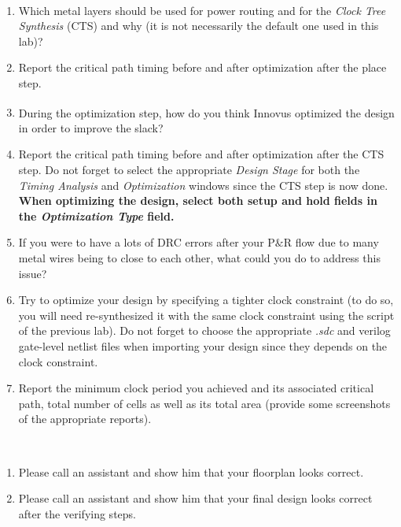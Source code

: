 \begin{exercisesum}\	
	\vspace{-2mm}
	\begin{enumerate}
		\item Which metal layers should be used for power routing and for the \textit{Clock Tree Synthesis} (CTS) and why (it is not necessarily the default one used in this lab)?
		\item Report the critical path timing before and after optimization after the place step.
		\item During the optimization step, how do you think Innovus\textsuperscript{\tiny\textregistered} optimized the design in order to improve the slack?
		\item Report the critical path timing before and after optimization after the CTS step. Do not forget to select the appropriate \textit{Design Stage} for both the \textit{Timing Analysis} and \textit{Optimization} windows since the CTS step is now done. \textbf{When optimizing the design, select both setup and hold fields in the \textit{Optimization Type} field.}
		\item If you were to have a lots of DRC errors after your P$\&$R flow due to many metal wires being to close to each other, what could you do to address this issue?
		\item Try to optimize your design by specifying a tighter clock constraint (to do so, you will need re-synthesized it with the same clock constraint using the script of the previous lab). Do not forget to choose the appropriate \textit{.sdc} and verilog gate-level netlist files when importing your design since they depends on the clock constraint.
		\item Report the minimum clock period you achieved and its associated critical path, total number of cells as well as its total area (provide some screenshots of the appropriate reports). 
	\end{enumerate}
	\vspace{-5mm}
\end{exercisesum}	


\begin{checkpointsum}\
	\vspace{-2mm}
	\begin{enumerate}
		\item Please call an assistant and show him that your floorplan looks correct.
		\item Please call an assistant and show him that your final design looks correct after the verifying steps.
	\end{enumerate}
	\vspace{-5mm}
\end{checkpointsum}